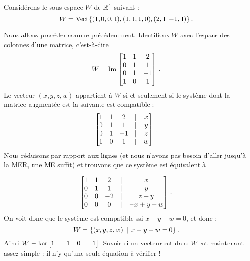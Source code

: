 \begin{myexample}
Considérons le sous-espace $W$ de $\R^4$ suivant : $$W=\sp{ (1,0,0,1), (1,1,1,0), (2,1,-1,1)}\,.$$

Nous allons procéder comme précédemment. Identifions $W$ avec l'espace des colonnes d'une matrice, c'est-à-dire
$$W=\im \mat{1&1&2\\0&1&1\\0&1&-1\\1&0&1}\,.$$ 
Le vecteur $(x,y,z,w)$ appartient à $W$ si et seulement si le syst\`eme dont la matrice augment\'ee est la suivante est compatible :
$$\mat{1&1&2&|&x\\0&1&1&|&y\\0&1&-1&|&z\\1&0&1&|&w}\,.$$ Nous réduisons par rapport aux lignes (et nous n'avons pas besoin d'aller jusqu'\`a la MER, une ME suffit) et trouvons que ce système est équivalent à 

$$\mat{1&1&2&|&x\\0&1&1&|&y\\0&0&-2&|&z-y\\0&0&0&|&-x+y+w}\,.$$
On voit donc que le système est compatible ssi $x-y-w=0$, et donc : $$W=\set{(x,y,z,w)\st x-y-w=0 } \,.$$ Ainsi
$W=\ker\mat{1&-1&0&-1}$. Savoir si un vecteur est dans $W$ est maintenant assez simple : il n'y qu'une seule équation à vérifier !
\end{myexample}


